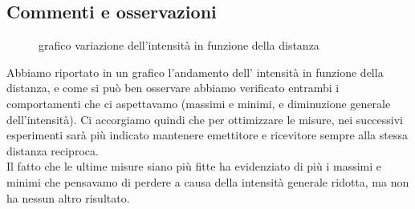 \documentclass{article}
\theoremstyle{definition}
\begin{document}
\begin{table}[!h]
    	\captionsetup{labelformat=empty}

\end{table}

\begin{table}[!h]
    	\captionsetup{labelformat=empty}

\end{table}




\subsection{Commenti e osservazioni}


\begin{figure}[!ht]
    	\captionsetup{labelformat=empty}
    	\caption{grafico variazione dell'intensità in funzione della distanza}
\end{figure}

Abbiamo riportato in un grafico l'andamento dell' intensità in funzione della distanza, e come si può ben osservare abbiamo verificato entrambi i comportamenti che ci aspettavamo (massimi e minimi, e diminuzione generale dell'intensità). Ci accorgiamo quindi che per ottimizzare le misure, nei successivi esperimenti sarà più indicato mantenere emettitore e ricevitore sempre alla stessa distanza reciproca.\\
Il fatto che le ultime misure siano più fitte ha evidenziato di più i massimi e minimi che pensavamo di perdere a causa della intensità generale ridotta, ma non ha nessun altro risultato.\\
\end{document}

